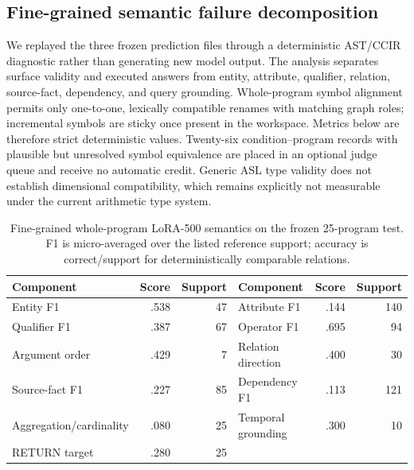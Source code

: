 \documentclass[11pt]{article}
\begin{document}
\subsection{Fine-grained semantic failure decomposition}

We replayed the three frozen prediction files through a deterministic AST/CCIR
diagnostic rather than generating new model output. The analysis separates
surface validity and executed answers from entity, attribute, qualifier,
relation, source-fact, dependency, and query grounding. Whole-program symbol
alignment permits only one-to-one, lexically compatible renames with matching
graph roles; incremental symbols are sticky once present in the workspace.
Metrics below are therefore strict deterministic values. Twenty-six
condition--program records with plausible but unresolved symbol equivalence are
placed in an optional judge queue and receive no automatic credit. Generic ASL
type validity does not establish dimensional compatibility, which remains
explicitly not measurable under the current arithmetic type system.

\begin{table}[t]
\centering\small
\caption{Fine-grained whole-program LoRA-500 semantics on the frozen 25-program
test. F1 is micro-averaged over the listed reference support; accuracy is
correct/support for deterministically comparable relations.}
\label{tab:asl-semantic-components}
\begin{tabular}{lrr@{\qquad}lrr}
\toprule
Component & Score & Support & Component & Score & Support\\
\midrule
Entity F1       & .538 & 47  & Attribute F1       & .144 & 140\\
Qualifier F1    & .387 & 67  & Operator F1        & .695 & 94\\
Argument order  & .429 & 7   & Relation direction & .400 & 30\\
Source-fact F1  & .227 & 85  & Dependency F1      & .113 & 121\\
Aggregation/cardinality & .080 & 25 & Temporal grounding & .300 & 10\\
RETURN target   & .280 & 25  & & & \\
\bottomrule
\end{tabular}
\end{table}
\end{document}
